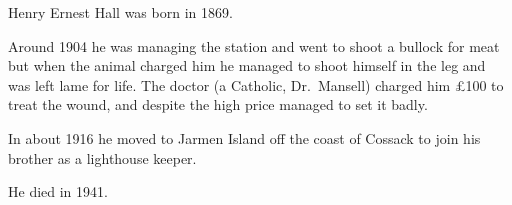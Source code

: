 
Henry Ernest Hall was born in 1869.

Around 1904 he was managing the station and went to shoot a bullock for meat but when the animal charged him he managed to shoot himself in the leg and was left lame for life.
The doctor (a Catholic, Dr.~Mansell) charged him \pounds 100 to treat the wound, and despite the high price managed to set it badly.

In about 1916 he moved to Jarmen Island off the coast of Cossack to join his brother   as a lighthouse keeper.\cite{Connie1983}  

He died in 1941.
